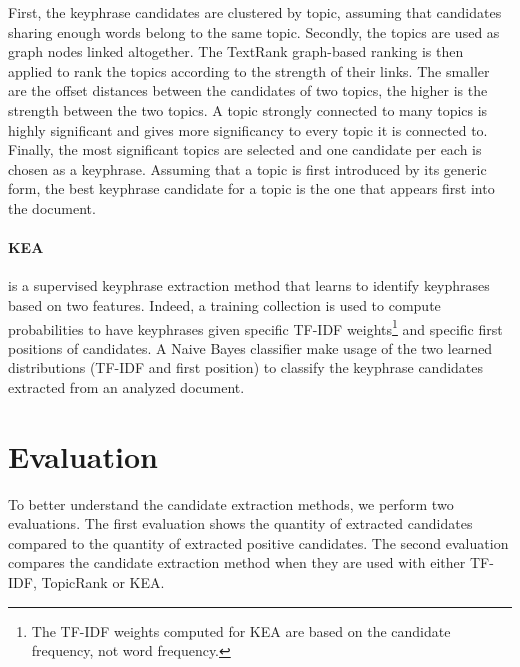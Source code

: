   First, the keyphrase candidates are clustered by topic, assuming that
  candidates sharing enough words belong to the same topic. Secondly, the
  topics are used as graph nodes linked altogether. The TextRank graph-based
  ranking is then applied to rank the topics according to the strength of their
  links. The smaller are the offset distances between the candidates of two
  topics, the higher is the strength between the two topics. A topic strongly
  connected to many topics is highly significant and gives more significancy to
  every topic it is connected to. Finally, the most significant topics are
  selected and one candidate per each is chosen as a keyphrase. Assuming that a
  topic is first introduced by its generic form, the best keyphrase candidate
  for a topic is the one that appears first into the document.

  \paragraph{KEA} is a supervised keyphrase extraction method that learns to
  identify keyphrases based on two features. Indeed, a training collection is
  used to compute probabilities to have keyphrases given specific TF-IDF
  weights\footnote{The TF-IDF weights computed for KEA are based on the
  candidate frequency, not word frequency.} and specific first positions of
  candidates. A Naive Bayes classifier make usage of the two learned
  distributions (TF-IDF and first position) to classify the keyphrase candidates
  extracted from an analyzed document.

\section{Evaluation}
\label{sec:evaluation}
  To better understand the candidate extraction methods, we perform two
  evaluations. The first evaluation shows the quantity of extracted candidates
  compared to the quantity of extracted positive candidates. The second
  evaluation compares the candidate extraction method when they are used with
  either TF-IDF, TopicRank or KEA.

